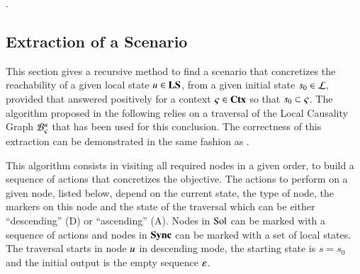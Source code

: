 .



\subsection{Extraction of a Scenario}
\label{ssec:concret}

This section gives a recursive method to find a scenario that concretizes
the reachability of a given local state $u \in \mathbf{LS}$,
from a given initial state $s_0 \in \mathcal{L}$,
provided that  answered positively
for a context $\varsigma \in \mathbf{Ctx}$ so that $s_0 \subset \varsigma$.
The algorithm proposed in the following relies on a traversal of the Local Causality Graph
${\mathcal{B}_{\varsigma}^{u}}$ that has been used for this conclusion.
The correctness of this extraction can be demonstrated
in the same fashion as .

This algorithm consists in visiting all required nodes in a given order,
to build a sequence of actions that concretizes the objective.
The actions to perform on a given node,
listed below,
depend on the current state, the type of node, the markers on this node
and the state of the traversal which can be either “descending” (D) or “ascending” (A).
Nodes in $\mathrm{Sol}$ can be marked with a sequence of actions
and nodes in $\mathbf{Sync}$ can be marked with a set of local states.
The traversal starts in node $u$ in descending mode,
the starting state is $s = s_0$
and the initial output is the empty sequence $\varepsilon$.

